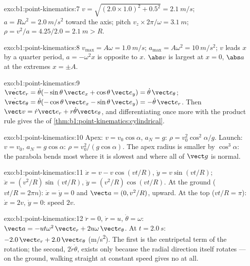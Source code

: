 \begin{solution}{exo:b1:point-kinematics:7}
$v = \sqrt{(2.0 \times 1.0)^2 + 0.5^2} = \qty{2.1}{m/s}$; $a = R\omega^2 =
\qty{2.0}{m/s^2}$ toward the axis; pitch $v_z \times 2\pi/\omega =
\qty{3.1}{m}$; $\rho = v^2/a = 4.25/2.0 = \qty{2.1}{m} > R$.
\end{solution}

\begin{solution}{exo:b1:point-kinematics:8}
$v_{\max} = A\omega = \qty{1.0}{m/s}$; $a_{\max} = A\omega^2 = \qty{10}{m/s^2}$;
$v$ leads $x$ by a quarter period, $a = -\omega^2x$ is opposite to $x$.
$\abs v$ is largest at $x = 0$, $\abs a$ at the extremes $x = \pm A$.
\end{solution}

\begin{solution}{exo:b1:point-kinematics:9}
$\dot{\vect e}_r = \dot\theta(-\sin\theta\,\vect e_x + \cos\theta\,\vect e_y)
= \dot\theta\,\vect e_\theta$; $\dot{\vect e}_\theta = \dot\theta(-\cos\theta\,
\vect e_x - \sin\theta\,\vect e_y) = -\dot\theta\,\vect e_r$. Then
$\vect v = \dot r\vect e_r + r\dot\theta\vect e_\theta$, and differentiating
once more with the product rule gives the  of
\cref{thm:b1:point-kinematics:cylindrical}.
\end{solution}

\begin{solution}{exo:b1:point-kinematics:10}
Apex: $v = v_0\cos\alpha$, $a_N = g$: $\rho = v_0^2\cos^2\alpha/g$.
Launch: $v = v_0$, $a_N = g\cos\alpha$: $\rho = v_0^2/(g\cos\alpha)$.
The apex radius is smaller by $\cos^3\alpha$: the parabola bends most
where it is slowest and where all of $\vect g$ is normal.
\end{solution}

\begin{solution}{exo:b1:point-kinematics:11}
$\dot x = v - v\cos(vt/R)$, $\dot y = v\sin(vt/R)$; $\ddot x = (v^2/R)
\sin(vt/R)$, $\ddot y = (v^2/R)\cos(vt/R)$. At the ground ($vt/R = 2\pi n$):
$\dot x = \dot y = 0$ and $\vect a = (0, v^2/R)$, upward. At the top
($vt/R = \pi$): $\dot x = 2v$, $\dot y = 0$: speed $2v$.
\end{solution}

\begin{solution}{exo:b1:point-kinematics:12}
$\ddot r = 0$, $\dot r = u$, $\dot\theta = \omega$: $\vect a = -ut\omega^2\,
\vect e_r + 2u\omega\,\vect e_\theta$. At $t = \qty{2.0}{s}$: $-2.0\,\vect e_r
+ 2.0\,\vect e_\theta$ (\unit{m/s^2}). The first is the centripetal term
of the rotation; the second, $2\dot r\dot\theta$, exists only because the
radial direction itself rotates --- on the ground, walking straight at
constant speed gives no  at all.
\end{solution}

